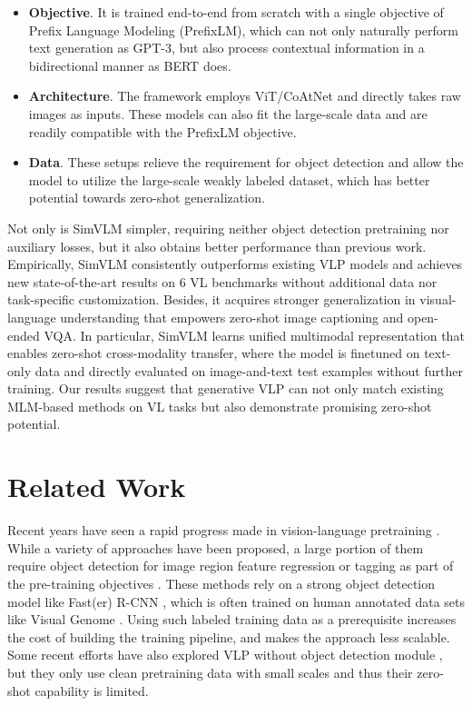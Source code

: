 \begin{itemize}
    \item \textbf{Objective}. It is trained end-to-end from scratch with a single objective of Prefix Language Modeling (PrefixLM), which can not only naturally perform text generation as GPT-3, but also process contextual information in a bidirectional manner as BERT does.
    \item \textbf{Architecture}. The framework employs ViT/CoAtNet \citep{dosovitskiy2021an,dai2021coatnet} and directly takes raw images as inputs. These models can also fit the large-scale data and are readily compatible with the PrefixLM objective.    
    \item \textbf{Data}. These setups relieve the requirement for object detection and allow the model to utilize the large-scale weakly labeled dataset, which has better potential towards zero-shot generalization.
\end{itemize}

Not only is {SimVLM} simpler, requiring neither object detection pretraining nor auxiliary losses, but it also obtains better performance than previous work. Empirically, {SimVLM} consistently outperforms existing VLP models and achieves new state-of-the-art results on 6 VL benchmarks without additional data nor task-specific customization. Besides, it acquires stronger generalization in visual-language understanding that empowers zero-shot image captioning and open-ended VQA. In particular, {SimVLM} learns unified multimodal representation that enables zero-shot cross-modality transfer, where the model is finetuned on text-only data and directly evaluated on image-and-text test examples without further training. Our results suggest that generative VLP can not only match existing MLM-based methods on VL tasks but also demonstrate promising zero-shot potential.

\section{Related Work}

Recent years have seen a rapid progress made in vision-language pretraining \citep{uppal2020multimodal,han2021survey,khan2021transformers}. While a variety of approaches have been proposed, a large portion of them require object detection for image region feature regression or tagging as part of the pre-training objectives \citep{tan-bansal-2019-lxmert,Su2020VL-BERT,li2019visualbert,chen2020uniter,gan2020large,li2020oscar,yu2021ernie,li-etal-2021-unimo,Zhang_2021_CVPR,hu2021vivo,cho2021unifying}. These methods rely on a strong object detection model like Fast(er) R-CNN \citep{NIPS2015_14bfa6bb}, which is often trained on human annotated data sets like Visual Genome \citep{krishnavisualgenome}. Using such labeled training data as a prerequisite increases the cost of building the training pipeline, and makes the approach less scalable. Some recent efforts have also explored VLP without object detection module \citep{xu-etal-2021-e2e, kim2021vilt, huang2021seeing}, but they only use clean pretraining data with small scales and thus their zero-shot capability is limited.

